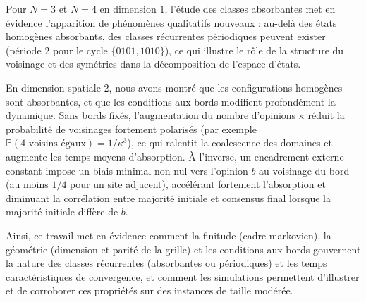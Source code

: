 \documentclass[11pt,a4paper]{article}
\begin{document}
Pour $N=3$ et $N=4$ en dimension $1$, l’étude des classes absorbantes
met en évidence l’apparition de phénomènes qualitatifs nouveaux :
au-delà des états homogènes absorbants, des classes récurrentes
périodiques peuvent exister (période $2$ pour le cycle
$\{0101,1010\}$), ce qui illustre le rôle de la structure du voisinage
et des symétries dans la décomposition de l’espace d’états.

En dimension spatiale $2$, nous avons montré que les configurations
homogènes sont absorbantes, et que les conditions aux bords modifient
profondément la dynamique. Sans bords fixés, l’augmentation du nombre
d’opinions $\kappa$ réduit la probabilité de voisinages fortement
polarisés (par exemple $\mathbb{P}(\text{4 voisins
  égaux})=1/\kappa^3$), ce qui ralentit la coalescence des domaines et
augmente les temps moyens d’absorption. À l’inverse, un encadrement
externe constant impose un biais minimal non nul vers l’opinion $b$ au
voisinage du bord (au moins $1/4$ pour un site adjacent), accélérant
fortement l’absorption et diminuant la corrélation entre majorité
initiale et consensus final lorsque la majorité initiale diffère de
$b$.

Ainsi, ce travail met en évidence comment la finitude (cadre
markovien), la géométrie (dimension et parité de la grille) et les
conditions aux bords gouvernent la nature des classes récurrentes
(absorbantes ou périodiques) et les temps caractéristiques de
convergence, et comment les simulations permettent d’illustrer et de
corroborer ces propriétés sur des instances de taille modérée.


  
\end{document}
